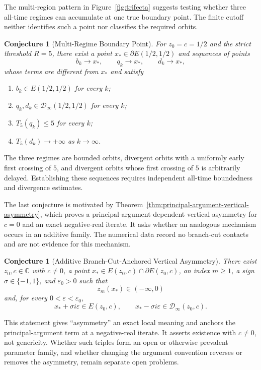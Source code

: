 \documentclass[12pt,a4paper]{amsart}
\newtheorem{conjecture}[theorem]{Conjecture}
\theoremstyle{remark}
\newcommand{\C}{\mathbb{C}}
\begin{document}
The multi-region pattern in Figure~\ref{fig:trifecta} suggests testing whether
three all-time regimes can accumulate at one true boundary point. The finite
cutoff neither identifies such a point nor classifies the required orbits.

\begin{conjecture}[Multi-Regime Boundary Point]
\label{conj:multi_sector_boundary}
For $z_0=c=1/2$ and the strict threshold $R=5$, there exist a point
$x_*\in\partial E(1/2,1/2)$ and sequences of points
\[
b_k\to x_*,
\qquad
q_k\to x_*,
\qquad
d_k\to x_*,
\]
whose terms are different from $x_*$ and satisfy
\begin{enumerate}
    \item $b_k\in E(1/2,1/2)$ for every $k$;
    \item $q_k,d_k\in\mathcal{D}_{\infty}(1/2,1/2)$ for every $k$;
    \item $T_5(q_k)\le5$ for every $k$;
    \item $T_5(d_k)\to+\infty$ as $k\to\infty$.
\end{enumerate}
\end{conjecture}

The three regimes are bounded orbits, divergent orbits with a uniformly early
first crossing of $5$, and divergent orbits whose first crossing of $5$ is
arbitrarily delayed. Establishing these sequences requires independent
all-time boundedness and divergence estimates.

The last conjecture is motivated by
Theorem~\ref{thm:principal-argument-vertical-asymmetry}, which proves a
principal-argument-dependent vertical asymmetry for $c=0$ and an exact
negative-real iterate. It asks whether an analogous mechanism occurs in an
additive family. The numerical data record no branch-cut contacts and are not
evidence for this mechanism.

\begin{conjecture}[Additive Branch-Cut-Anchored Vertical Asymmetry]
\label{conj:generic_branch_cut}
There exist $z_0,c\in\C$ with $c\ne0$, a point
$x_*\in E(z_0,c)\cap\partial E(z_0,c)$, an index $m\ge1$, a sign
$\sigma\in\{-1,1\}$, and $\varepsilon_0>0$ such that
\[
z_m(x_*)\in(-\infty,0)
\]
and, for every $0<\varepsilon<\varepsilon_0$,
\[
x_*+\sigma i\varepsilon\in E(z_0,c),
\qquad
x_*-\sigma i\varepsilon\in\mathcal{D}_{\infty}(z_0,c).
\]
\end{conjecture}

This statement gives ``asymmetry'' an exact local meaning and anchors the
principal-argument term at a negative-real iterate. It asserts existence with
$c\ne0$, not genericity. Whether such triples form an open or otherwise
prevalent parameter family, and whether changing the argument convention reverses
or removes the asymmetry, remain separate open problems.
\end{document}
